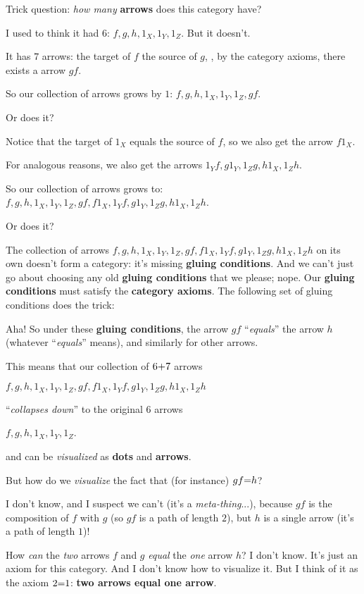 \vs
Trick question: {\it how many} {\bf arrows} does this category have? \par
I used to think it had $6$: $f,g,h,1_X,1_Y,1_Z$. But it doesn't. \par
It has $7$ arrows:  the target of $f$  the source of $g$, , by the category axioms, there exists a arrow $gf$. \par
So our collection of arrows grows by $1$: $f,g,h,1_X,1_Y,1_Z,gf$. \par
Or does it? \par
Notice that the target of $1_X$ equals the source of $f$, so we also get the arrow $f1_X$. \par
For analogous reasons, we also get the arrows $1_Yf,g1_Y,1_Zg,h1_X,1_Zh$. \par
So our collection of arrows grows to: $f,g,h,1_X,1_Y,1_Z,gf,f1_X,1_Yf,g1_Y,1_Zg,h1_X,1_Zh$. \par
Or does it? \par
The collection of arrows $f,g,h,1_X,1_Y,1_Z,gf,f1_X,1_Yf,g1_Y,1_Zg,h1_X,1_Zh$ on its own doesn't form a category: it's missing {\bf gluing conditions}.
And we can't just go about choosing any old {\bf gluing conditions} that we please; nope. Our {\bf gluing conditions} must satisfy the {\bf category axioms}. The following set of gluing conditions does the trick: \par
{}\par
Aha! So under these {\bf gluing conditions}, the arrow $gf$ ``{\it equals}'' the arrow $h$ (whatever ``{\it equals}'' means), and similarly for other arrows. \par
This means that our collection of $6\p+7$ arrows \par
  \hs $f,g,h,1_X,1_Y,1_Z,gf,f1_X,1_Yf,g1_Y,1_Zg,h1_X,1_Zh$ \par
``{\it collapses down}'' to the original $6$ arrows \par
  \hs $f,g,h,1_X,1_Y,1_Z$. \par

\vs
{} and  can be {\it visualized} as {\bf dots} and {\bf arrows}. \par
But how do we {\it visualize} the fact that (for instance) $gf \p= h$? \par
I don't know, and I suspect we can't (it's a {\it meta-thing}...), because $gf$ is the composition of $f$ with $g$ (so $gf$ is a path of length $2$), but $h$ is a single arrow (it's a path of length $1$)! \par
How {\it can} the {\it two} arrows $f$ and $g$ {\it equal} the {\it one} arrow $h$? I don't know. It's just an axiom for this category. And I don't know how to visualize it. But I think of it as the axiom $2 \p= 1$: {\bf two arrows equal one arrow}. \par

